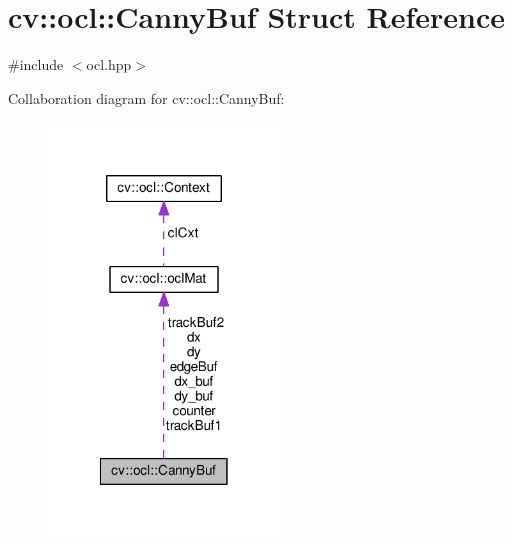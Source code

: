 \hypertarget{structcv_1_1ocl_1_1CannyBuf}{\section{cv\-:\-:ocl\-:\-:Canny\-Buf Struct Reference}
\label{structcv_1_1ocl_1_1CannyBuf}
}


{\ttfamily \#include $<$ocl.\-hpp$>$}



Collaboration diagram for cv\-:\-:ocl\-:\-:Canny\-Buf\-:\nopagebreak
\begin{figure}[H]
\begin{center}
\leavevmode
\includegraphics[width=174pt]{structcv_1_1ocl_1_1CannyBuf__coll__graph}
\end{center}
\end{figure}
